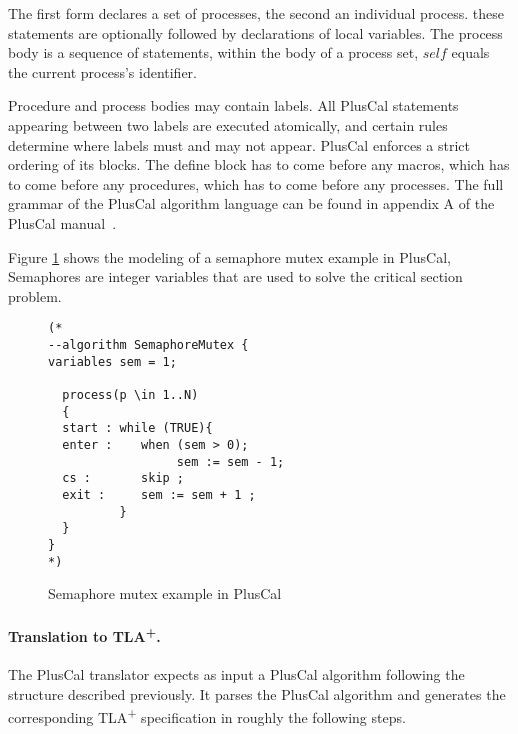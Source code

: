 \documentclass{thesul}
\newcommand{\tlaplus}{TLA\textsuperscript{+}\xspace}
\begin{document}
The first form declares a set of processes, the second an individual process. these statements are optionally followed by declarations of local variables. The process body is a sequence of statements, within the body of a process set, $self$ equals the current process's identifier.

Procedure and process bodies may contain labels. All PlusCal statements appearing between two labels are executed atomically, and certain rules determine where labels must and may not appear.
PlusCal enforces a strict ordering of its blocks. The define block has to come before any macros, which has to come before any procedures, which has to come before any processes. The full grammar of the PlusCal algorithm language can be found in appendix A of the PlusCal manual~\cite{pcalAlgo}.

Figure \ref{semaphoreEx} shows the modeling of a semaphore mutex example in PlusCal, Semaphores are integer variables that are used to solve the critical section problem.

\FloatBarrier 
\begin{figure}
\begin{lstlisting}[frame = tlrb, firstnumber = 1]
(*
--algorithm SemaphoreMutex {
variables sem = 1;

  process(p \in 1..N)
  {
  start : while (TRUE){
  enter :    when (sem > 0);
                  sem := sem - 1;            
  cs :       skip ;
  exit :     sem := sem + 1 ;
          }
  }
}
*)

\end{lstlisting}
\caption{Semaphore mutex example in PlusCal}
\label{semaphoreEx}
\end{figure} 

\paragraph{Translation to \tlaplus.}
The PlusCal translator expects as input a PlusCal algorithm following the structure described previously.
%
It parses the PlusCal algorithm and generates the corresponding \tlaplus specification in roughly the following steps.
\end{document}
